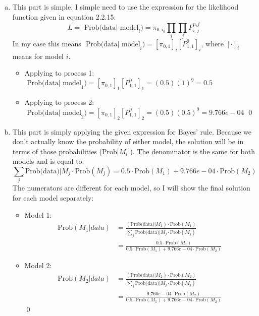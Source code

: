 \documentclass{homework}
\begin{document}
\begin{homeworkProblem}[Problem 2.3]
{\begin{enumerate}[a.]
          \item This part is simple. I simple need to use the expression for the likelihood function given in equation 2.2.15: $$ L = \text{ Prob(data| model}_i) = \pi_{0, i_0} \prod_i \prod_j P_{i,j}^{n_ij}$$ In my case this means $\text{ Prob(data| model}_i) = \left[ \pi_{0, 1} \right]_i \left[P_{1, 1}^9 \right]_i$, where $[\cdot]_i$ means for model $i$.

            \begin{itemize}
              \item Applying to process 1: $\text{ Prob(data| model}_1) = \left[ \pi_{0, 1} \right]_1 \left[P_{1, 1}^9 \right]_1 = (0.5) (1)^9 = 0.5$
              \item Applying to process 2: $\text{ Prob(data| model}_2) = \left[ \pi_{0, 1} \right]_2 \left[P_{1, 1}^9 \right]_2 = (0.5) (0.5)^9 = 9.766 e-04$ \qed
            \end{itemize}

          \item This part is simply applying the given expression for Bayes' rule. Because we don't actually know the probability of either model, the solution will be in terms of those probabilities (Prob[$M_i$]). The denominator is the same for both models and is equal to: $$\sum_j \text{Prob(data)}|M_j \cdot \text{Prob}(M_j) = 0.5 \cdot \text{Prob}(M_1) + 9.766 e-04 \cdot \text{Prob}(M_2)$$ The numerators are different for each model, so I will show the final solution for each model separately:

            \begin{itemize}
              \item Model 1:
                \begin{align*}
                  \text{Prob}(M_1|data) &= \frac{\left( \text{Prob(data)}|M_1\right) \cdot \text{Prob}(M_1)}{\sum_j \text{Prob(data)}|M_j \cdot \text{Prob}(M_j)} \\
                    &= \frac{0.5 \cdot \text{Prob}(M_1)}{0.5 \cdot \text{Prob}(M_1) + 9.766 e-04 \cdot \text{Prob}(M_2)}
                \end{align*}
                \item Model 2:
                \begin{align*}
                  \text{Prob}(M_2|data) &= \frac{\left( \text{Prob(data)}|M_2\right) \cdot \text{Prob}(M_2)}{\sum_j \text{Prob(data)}|M_j \cdot \text{Prob}(M_j)} \\
                    &= \frac{9.766 e-04 \cdot \text{Prob}(M_2)}{0.5 \cdot \text{Prob}(M_1) + 9.766 e-04 \cdot \text{Prob}(M_2)}
                \end{align*} \qed
            \end{itemize}


\end{enumerate}}
\end{homeworkProblem}
\end{document}
